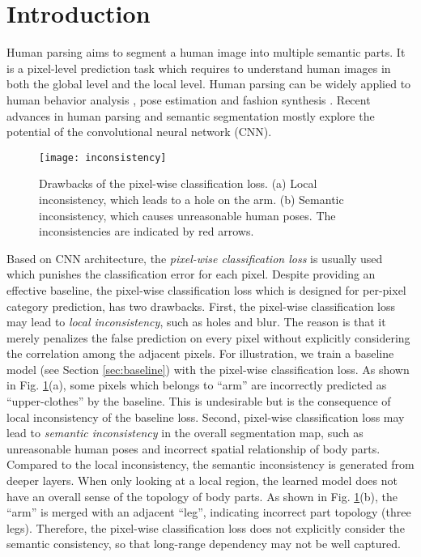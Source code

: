 \documentclass[runningheads]{llncs}
\begin{document}
\section{Introduction}
Human parsing aims to segment a human image into multiple semantic parts. It is a pixel-level prediction task which requires to understand human images in both the global level and  the local level. Human parsing can be widely applied to human behavior analysis \cite{gan2016concepts}, pose estimation \cite{xia2016pose} and fashion synthesis \cite{iccv2017fashiongan}.
Recent advances in human parsing and semantic segmentation \cite{liang2015deep,xia2016pose,gong2017look,long2015fully,zhang2018adversarial,zhang2018self} mostly explore the potential of the convolutional neural network (CNN).

\begin{figure}[t]
\centering
\texttt{[image: inconsistency]}
\caption{Drawbacks of the pixel-wise classification loss. (a) Local inconsistency, which leads to a hole on the arm. (b) Semantic inconsistency, which causes unreasonable human poses. The inconsistencies are indicated by red arrows.}
\label{fig:motivation}
\end{figure}

Based on CNN architecture, the \emph{pixel-wise classification loss} is usually used \cite{liang2015deep,xia2016pose,gong2017look} which punishes the classification error for each pixel. Despite providing an effective baseline, the pixel-wise classification loss which is designed for per-pixel category prediction, has two drawbacks.
First, the pixel-wise classification loss may lead to  \emph{local inconsistency}, such as holes and blur. The reason is that it merely penalizes the false prediction on every pixel without explicitly considering the correlation among the adjacent pixels. For illustration, we train a baseline model (see Section \ref{sec:baseline}) with the pixel-wise classification loss. As shown in Fig. \ref{fig:motivation}(a), some pixels which belongs to ``arm'' are incorrectly predicted as ``upper-clothes'' by the baseline. This is undesirable but is the consequence of local inconsistency of the baseline loss.
Second, pixel-wise classification loss may lead to \emph{semantic inconsistency} in the overall segmentation map, such as unreasonable human poses and incorrect spatial relationship of body parts. Compared to the local inconsistency, the semantic inconsistency is generated from deeper layers. When only looking at a local region, the learned model does not have an overall sense of the topology of body parts. As shown in Fig. \ref{fig:motivation}(b), the ``arm'' is merged with an adjacent ``leg'', indicating incorrect part topology (three legs). Therefore, the pixel-wise classification loss does not explicitly consider the semantic consistency, so that long-range dependency may not be well captured.
\end{document}
